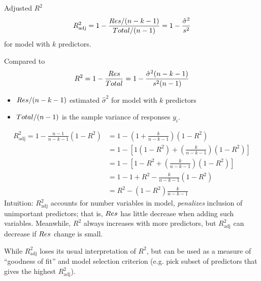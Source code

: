 \begin{Definition}{Adjusted $ R^2 $}{}
    \[ R^2_{\text{adj}}=1-\frac{\relax{Res}/(n-k-1)}{
            \relax{Total}/(n-1)
        }=1-\frac{\hat{\sigma}^2}{s^2}  \]
    for model with $ k $ predictors.
\end{Definition}
Compared to
\[ R^2=1-\frac{\relax{Res}}{\relax{Total}}=1-\frac{\hat{\sigma}^2(n-k-1)}{s^2(n-1)}   \]
\begin{itemize}
    \item $ \relax{Res}/(n-k-1) $
          estimated $ \hat{\sigma}^2 $
          for model with $ k $ predictors
    \item $ \relax{Total}/(n-1) $ is the sample variance
          of responses $ y_i $.
\end{itemize}
\begin{align*}
    R^2_{\text{adj}}=1-\frac{n-1}{n-k-1}(1-R^2)
     & = 1-\left( 1+\frac{k}{n-k-1} \right)
    (1-R^2)                                                             \\
     & =1-\left[ 1(1-R^2)+\left( \frac{k}{n-k-1} \right)(1-R^2) \right] \\
     & =1-\left[ 1-R^2+\left( \frac{k}{n-k-1}  \right)(1-R^2) \right]   \\
     & =1-1+R^2-\frac{k}{n-k-1} (1-R^2)                                 \\
     & =R^2-(1-R^2)\frac{k}{n-k-1}
\end{align*}
Intuition: $ R^2_{\text{adj}} $
accounts for number variables in model,
\emph{penalizes} inclusion of unimportant
predictors; that is, $ \relax{Res} $
has little decrease when adding
such variables. Meanwhile, $ R^2 $
always increases with more predictors,
but $ R^2_{\text{adj}} $ can decrease
if $ \relax{Res} $ change is small.

While $ R^2_{\text{adj}} $ loses its usual
interpretation of $ R^2 $, but can be used
as a measure of ``goodness of fit''
and model selection criterion (e.g.
pick subset of predictors that gives the highest
$ R^2_{\text{adj}} $).



